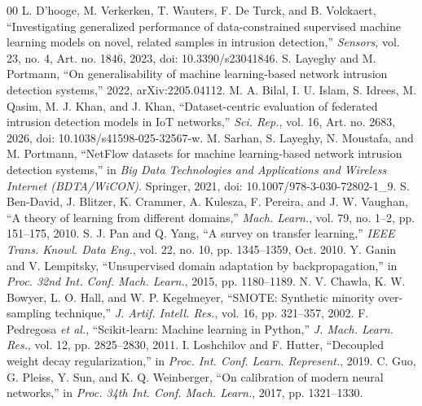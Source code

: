 \documentclass[conference]{IEEEtran}
\begin{document}
\begin{thebibliography}{00}
 L. D'hooge, M. Verkerken, T. Wauters, F. De Turck, and B. Volckaert, ``Investigating generalized performance of data-constrained supervised machine learning models on novel, related samples in intrusion detection,'' \emph{Sensors}, vol. 23, no. 4, Art. no. 1846, 2023, doi: 10.3390/s23041846.
 S. Layeghy and M. Portmann, ``On generalisability of machine learning-based network intrusion detection systems,'' 2022, arXiv:2205.04112.
 M. A. Bilal, I. U. Islam, S. Idrees, M. Qasim, M. J. Khan, and J. Khan, ``Dataset-centric evaluation of federated intrusion detection models in IoT networks,'' \emph{Sci. Rep.}, vol. 16, Art. no. 2683, 2026, doi: 10.1038/s41598-025-32567-w.
 M. Sarhan, S. Layeghy, N. Moustafa, and M. Portmann, ``NetFlow datasets for machine learning-based network intrusion detection systems,'' in \emph{Big Data Technologies and Applications and Wireless Internet (BDTA/WiCON)}. Springer, 2021, doi: 10.1007/978-3-030-72802-1\_9.
 S. Ben-David, J. Blitzer, K. Crammer, A. Kulesza, F. Pereira, and J. W. Vaughan, ``A theory of learning from different domains,'' \emph{Mach. Learn.}, vol. 79, no. 1--2, pp. 151--175, 2010.
 S. J. Pan and Q. Yang, ``A survey on transfer learning,'' \emph{IEEE Trans. Knowl. Data Eng.}, vol. 22, no. 10, pp. 1345--1359, Oct. 2010.
 Y. Ganin and V. Lempitsky, ``Unsupervised domain adaptation by backpropagation,'' in \emph{Proc. 32nd Int. Conf. Mach. Learn.}, 2015, pp. 1180--1189.
 N. V. Chawla, K. W. Bowyer, L. O. Hall, and W. P. Kegelmeyer, ``SMOTE: Synthetic minority over-sampling technique,'' \emph{J. Artif. Intell. Res.}, vol. 16, pp. 321--357, 2002.
 F. Pedregosa \emph{et al.}, ``Scikit-learn: Machine learning in Python,'' \emph{J. Mach. Learn. Res.}, vol. 12, pp. 2825--2830, 2011.
 I. Loshchilov and F. Hutter, ``Decoupled weight decay regularization,'' in \emph{Proc. Int. Conf. Learn. Represent.}, 2019.
 C. Guo, G. Pleiss, Y. Sun, and K. Q. Weinberger, ``On calibration of modern neural networks,'' in \emph{Proc. 34th Int. Conf. Mach. Learn.}, 2017, pp. 1321--1330.
\end{thebibliography}
\end{document}
